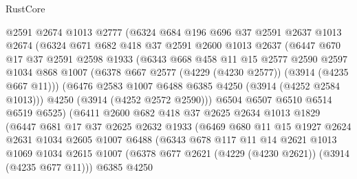 \begin{lexlean}{RustCore}
\begin{coremodule}
              @2591
              @2674
              @1013
              @2777
              (@6324
                @684
                @196
                @696
                @37
                @2591
                @2637
                @1013
                @2674
                (@6324
                  @671
                  @682
                  @418
                  @37
                  @2591
                  @2600
                  @1013
                  @2637
                  (@6447
                    @670
                    @17
                    @37
                    @2591
                    @2598
                    @1933
                    (@6343
                      @668
                      @458
                      @11
                      @15
                      @2577
                      @2590
                      @2597
                      @1034
                      @868
                      @1007
                      (@6378 @667 @2577 (@4229 (@4230 @2577)) (@3914 (@4235 @667 @11)))
                      (@6476 @2583 @1007 @6488 @6385 @4250 (@3914 (@4252 @2584 @1013)))
                      @4250
                      (@3914 (@4252 @2572 @2590)))
                    @6504
                    @6507
                    @6510
                    @6514
                    @6519
                    @6525)
                  (@6411
                    @2600
                    @682
                    @418
                    @37
                    @2625
                    @2634
                    @1013
                    @1829
                    (@6447
                      @681
                      @17
                      @37
                      @2625
                      @2632
                      @1933
                      (@6469
                        @680
                        @11
                        @15
                        @1927
                        @2624
                        @2631
                        @1034
                        @2605
                        @1007
                        @6488
                        (@6343
                          @678
                          @117
                          @11
                          @14
                          @2621
                          @1013
                          @1069
                          @1034
                          @2615
                          @1007
                          (@6378 @677 @2621 (@4229 (@4230 @2621)) (@3914 (@4235 @677 @11)))
                          @6385
                          @4250

\end{coremodule}
\end{lexlean}
